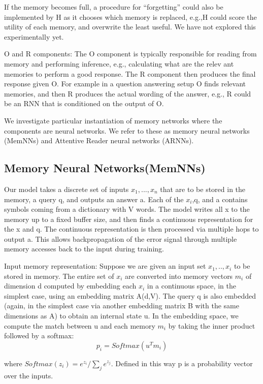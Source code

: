 \documentclass{article}
\begin{document}
If the memory becomes full,  a procedure for “forgetting” could also be implemented by H as it
chooses which memory is replaced, e.g.,H could score the utility of each memory, and overwrite the least useful. We have not explored this experimentally yet.

O and R components: The O component is typically responsible for reading from memory and performing inference, e.g., calculating what are the relev
ant memories to perform a good response. The R component then produces the final response given O.  For example in a question answering setup O finds relevant memories, and then R produces the actual wording of the answer, e.g., R could be an RNN that is conditioned on the output of O.

We investigate particular instantiation of memory networks where the components are neural networks. We refer to these as memory neural networks (MemNNs) and Attentive Reader neural networks (ARNNs). 

\subsection{Memory Neural Networks(MemNNs)}

Our model takes a discrete set of inputs $x_1,...,x_n$ that are to be stored in the memory, a query q, and outputs an answer a.  Each of the $x_i$,q, and a contains symbols coming from a dictionary with V words. The model writes all x
to the memory up to a fixed buffer size, and then finds a continuous representation for the x and q. The continuous representation is then processed via multiple hops to output a. This allows backpropagation of the error signal through multiple memory accesses back to the input during training.

Input memory representation: Suppose we are given an input set $x_1,..,x_i$ to be stored in memory. The  entire  set  of $x_i$ are  converted  into  memory  vectors $m_i$ of  dimension d computed  by embedding each $ x_i $ in a continuous space, in the simplest case, using an embedding matrix A(d,V). The query q is also embedded (again, in the simplest case via another embedding matrix B
with the same dimensions as A) to obtain an internal state u. In the embedding space, we compute the match between u and each memory $ m_i $ by taking the inner product followed by a softmax:
\begin{equation}
p_i = Softmax(u^T m_i)
\end{equation}

where $ Softmax(z_i) = e^{z_i} / \sum_j e^{z_j} $. Defined in this way p is a probability vector over the inputs.
\end{document}
